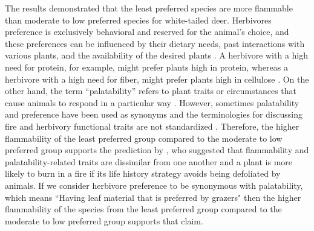 \documentclass{ttuthes2007}
\begin{document}
The results demonstrated that the least preferred species are more flammable than moderate to low preferred species for white-tailed deer. Herbivores preference is exclusively behavioral and reserved for the animal's choice, and these preferences can be influenced by their dietary needs, past interactions with various plants, and the availability of the desired plants \citep{heady1964palatability, wright2003white, mayntz2005nutrient}. A herbivore with a high need for protein, for example, might prefer plants high in protein, whereas a herbivore with a high need for fiber, might prefer plants high in cellulose \citep{mayntz2005nutrient}. On the other hand, the term ``palatability'' refers to plant traits or circumstances that cause animals to respond in a particular way \citep{heady1964palatability}. However, sometimes palatability and preference have been used as synonyms \citep{ivins1952relative} and the terminologies for discussing fire and herbivory functional traits are not standardized \citep{archibald2019unified}. Therefore, the higher flammability of the least preferred group compared to the moderate to low preferred group supports the prediction by \citet{archibald2019unified}, who suggested that flammability and palatability-related traits are dissimilar from one another and a plant is more likely to burn in a fire if its life history strategy avoids being defoliated by animals. If we consider herbivore preference to be synonymous with palatability, which means ``Having leaf material that is preferred by grazers" \citep{archibald2019unified} then the higher flammability of the species from the least preferred group compared to the moderate to low preferred group supports that claim.
\newlength{\bibitemsep}\setlength{\bibitemsep}{0.2\baselineskip plus .05\baselineskip minus .05\baselineskip}
\newlength{\bibparskip}\setlength{\bibparskip}{10pt}
\let\oldthebibliography\thebibliography
\renewcommand\thebibliography[1]{%
  \oldthebibliography{#1}%
  \setlength{\parskip}{\bibitemsep}%
  \setlength{\itemsep}{\bibparskip}%
  \interlinepenalty=10000
}
\end{document}
